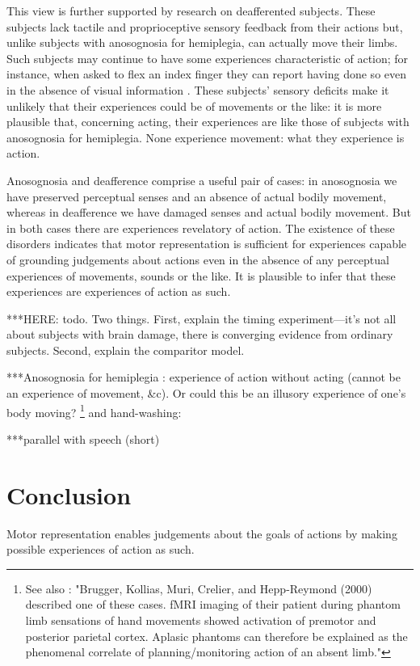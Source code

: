 \documentclass[12pt,\papersize]{extarticle}
\begin{document}
This view is further supported by research on deafferented subjects.  These subjects lack tactile and proprioceptive sensory feedback from their actions but, unlike subjects with anosognosia for hemiplegia, can actually move their limbs.  Such subjects may continue to have some experiences characteristic of action; for instance, when asked to flex an index finger they can report having done so even in the absence of visual information \citep{kristeva:2006}.  These subjects' sensory deficits make it unlikely that their experiences could be of movements or the like: it is more plausible that, concerning acting, their experiences are like those of subjects with anosognosia for hemiplegia.  None experience movement: what they experience is action.

Anosognosia and deafference comprise a useful pair of cases: in anosognosia we have preserved perceptual senses and an absence of actual bodily movement, whereas in deafference we have damaged senses and actual bodily movement.  But in both cases there are experiences revelatory of action.  The existence of these disorders indicates that motor representation is sufficient for experiences capable of grounding judgements about actions even in the absence of any perceptual experiences of movements, sounds or the like.  It is plausible to infer that these experiences are experiences of action as such.

***HERE: todo.  Two things.  First, explain the timing experiment---it's not all about subjects with brain damage, there is converging evidence from ordinary subjects.  Second, explain the comparitor model.  

***Anosognosia for hemiplegia : experience of action without acting (cannot be an experience of movement, \&c).  Or could this be an illusory experience of one's body moving?  \citep{garbarini:2012_moving}%
\footnote{
See also \citet{gallese:2010_bodily}: "Brugger, Kollias, Muri, Crelier, and Hepp-Reymond (2000) described one of these cases. fMRI imaging of their patient during phantom limb sensations of hand movements showed activation of premotor and posterior parietal cortex. Aplasic phantoms can therefore be explained as the phenomenal correlate of planning/monitoring action of an absent limb."}
and hand-washing: \citep{berti:2008_motor}

***parallel with speech (short)



\section{Conclusion}
Motor representation enables judgements about the goals of actions by making possible experiences of action as such.  
\end{document}
